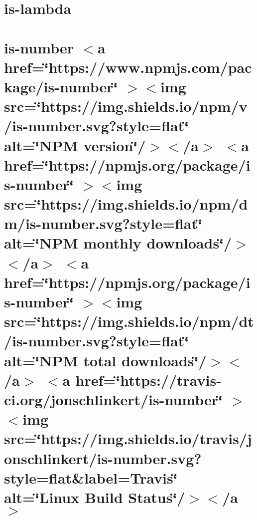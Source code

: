 \documentclass[twoside]{book}
\newcommand{\+}{\discretionary{\mbox{\scriptsize$\hookleftarrow$}}{}{}}
\begin{document}
\chapter{is-\/lambda}
\label{md__c___users_vaishnavi_jadhav__desktop__developer_code_mean_stack_example_client_node_modules_is_lambda__r_e_a_d_m_e}

\chapter{is-\/number \texorpdfstring{$<$}{<}a href=\char`\"{}https\+://www.\+npmjs.\+com/package/is-\/number\char`\"{} \texorpdfstring{$>$}{>}\texorpdfstring{$<$}{<}img src=\char`\"{}https\+://img.\+shields.\+io/npm/v/is-\/number.\+svg?style=flat\char`\"{} alt=\char`\"{}\+NPM version\char`\"{}/\texorpdfstring{$>$}{>}\texorpdfstring{$<$}{<}/a\texorpdfstring{$>$}{>} \texorpdfstring{$<$}{<}a href=\char`\"{}https\+://npmjs.\+org/package/is-\/number\char`\"{} \texorpdfstring{$>$}{>}\texorpdfstring{$<$}{<}img src=\char`\"{}https\+://img.\+shields.\+io/npm/dm/is-\/number.\+svg?style=flat\char`\"{} alt=\char`\"{}\+NPM monthly downloads\char`\"{}/\texorpdfstring{$>$}{>}\texorpdfstring{$<$}{<}/a\texorpdfstring{$>$}{>} \texorpdfstring{$<$}{<}a href=\char`\"{}https\+://npmjs.\+org/package/is-\/number\char`\"{} \texorpdfstring{$>$}{>}\texorpdfstring{$<$}{<}img src=\char`\"{}https\+://img.\+shields.\+io/npm/dt/is-\/number.\+svg?style=flat\char`\"{} alt=\char`\"{}\+NPM total downloads\char`\"{}/\texorpdfstring{$>$}{>}\texorpdfstring{$<$}{<}/a\texorpdfstring{$>$}{>} \texorpdfstring{$<$}{<}a href=\char`\"{}https\+://travis-\/ci.\+org/jonschlinkert/is-\/number\char`\"{} \texorpdfstring{$>$}{>}\texorpdfstring{$<$}{<}img src=\char`\"{}https\+://img.\+shields.\+io/travis/jonschlinkert/is-\/number.\+svg?style=flat\&label=\+Travis\char`\"{} alt=\char`\"{}\+Linux Build Status\char`\"{}/\texorpdfstring{$>$}{>}\texorpdfstring{$<$}{<}/a\texorpdfstring{$>$}{>}}
\label{md__c___users_vaishnavi_jadhav__desktop__developer_code_mean_stack_example_client_node_modules_is_number__r_e_a_d_m_e}

\end{document}
